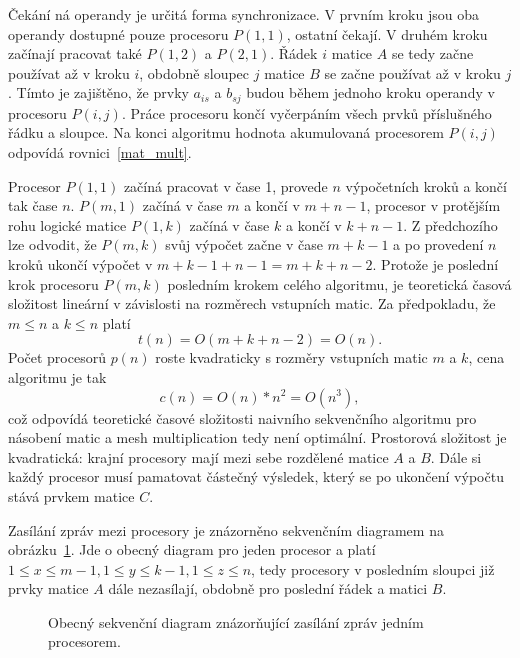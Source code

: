 \documentclass[a4paper, 12pt]{article}[24.4.2015]
\begin{document}
Čekání ná operandy je určitá forma synchronizace. V prvním kroku jsou oba operandy dostupné pouze procesoru \(P(1,1)\), ostatní čekají. V druhém kroku začínají pracovat také \(P(1,2)\) a \(P(2,1)\). Řádek \(i\) matice \(A\) se tedy začne používat až v kroku \(i\), obdobně sloupec \(j\) matice \(B\) se začne používat až v kroku \(j\). Tímto je zajištěno, že prvky \(a_{is}\) a \(b_{sj}\) budou během jednoho kroku operandy v procesoru \(P(i,j)\). Práce procesoru končí vyčerpáním všech prvků příslušného řádku a sloupce. Na konci algoritmu hodnota akumulovaná procesorem \(P(i,j)\) odpovídá rovnici~\ref{mat_mult}.

Procesor \(P(1,1)\) začíná pracovat v čase 1, provede \(n\) výpočetních kroků a končí tak čase \(n\). \(P(m, 1)\) začíná v čase \(m\) a končí v \(m + n - 1\), procesor v protějším rohu logické matice \(P(1, k)\) začíná v čase \(k\) a končí v \(k + n - 1\). Z předchozího lze odvodit, že \(P(m, k)\) svůj výpočet začne v čase \(m + k - 1\) a po provedení \(n\) kroků ukončí výpočet v \(m + k - 1 + n - 1 = m + k + n - 2\). Protože je poslední krok procesoru \(P(m, k)\) posledním krokem celého algoritmu, je teoretická časová složitost lineární v závislosti na rozměrech vstupních matic. Za předpokladu, že \(m \leq n\) a \(k \leq n\) platí
\[
t(n) = O(m + k + n - 2) = O(n).
\]
Počet procesorů \(p(n)\) roste kvadraticky s rozměry vstupních matic \(m\) a \(k\), cena algoritmu je tak
\[
c(n) = O(n) * n^2 = O(n^3),
\]
což odpovídá teoretické časové složitosti naivního sekvenčního algoritmu pro násobení matic a mesh multiplication tedy není optimální. Prostorová složitost je kvadratická: krajní procesory mají mezi sebe rozdělené matice \(A\) a \(B\). Dále si každý procesor musí pamatovat částečný výsledek, který se po ukončení výpočtu stává prvkem matice \(C\).

Zasílání zpráv mezi procesory je znázorněno sekvenčním diagramem na obrázku~\ref{fig:sequence}. Jde o obecný diagram pro jeden procesor a platí \(1 \leq x \leq m - 1, 1 \leq y \leq k - 1, 1 \leq z \leq n\), tedy procesory v posledním sloupci již prvky matice \(A\) dále nezasílají, obdobně pro poslední řádek a matici \(B\).
\begin{figure}
\centering
\resizebox{0.7\textwidth}{!}{}
\caption{Obecný sekvenční diagram znázorňující zasílání zpráv jedním procesorem.}
\label{fig:sequence}
\end{figure}

\end{document}
